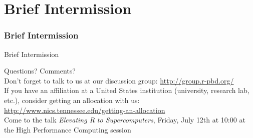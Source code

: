 \section[Break]{Brief Intermission}
\hidenum
\begin{frame}[noframenumbering]
\frametitle{Brief Intermission}
  \begin{block}{Brief Intermission}
  \begin{center}
     {\Large Questions?  Comments?}\\[.6cm]
     Don't forget to talk to us at our discussion group: \url{http://group.r-pbd.org/}\\[.6cm]
     If you have an affiliation at a United States institution (university, research lab, etc.), consider getting an allocation with us:  \\
     \url{http://www.nics.tennessee.edu/getting-an-allocation}
     \\[.6cm]
    Come to the talk \emph{Elevating R to Supercomputers}, Friday, July 12th at 10:00 at the High Performance Computing session
  \end{center}
  \end{block}
\end{frame}
\shownum

